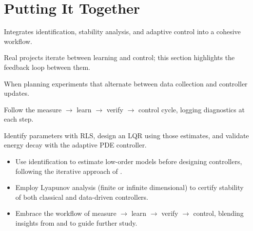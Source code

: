 \section{Putting It Together}
\begin{beginnerguide}
    \item[\textbf{What?}] Integrates identification, stability analysis, and adaptive control into a cohesive workflow.
    \item[\textbf{Why?}] Real projects iterate between learning and control; this section highlights the feedback loop between them.
    \item[\textbf{When?}] When planning experiments that alternate between data collection and controller updates.
    \item[\textbf{How?}] Follow the measure $\rightarrow$ learn $\rightarrow$ verify $\rightarrow$ control cycle, logging diagnostics at each step.
    \item[\textbf{Example}] Identify parameters with RLS, design an LQR using those estimates, and validate energy decay with the adaptive PDE controller.
\end{beginnerguide}
\begin{itemize}[leftmargin=*]
    \item Use identification to estimate low-order models before designing controllers, following the iterative approach of \textcite{astrom1995pid}.
    \item Employ Lyapunov analysis (finite or infinite dimensional) to certify stability of both classical and data-driven controllers.
    \item Embrace the workflow of measure $\rightarrow$ learn $\rightarrow$ verify $\rightarrow$ control, blending insights from \textcite{ljung2012control} and \textcite{krstic1995nonlinear} to guide further study.
\end{itemize}

